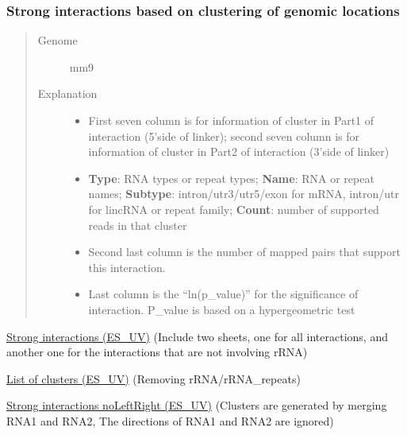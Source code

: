 \documentclass[letterpaper,10pt,english]{sphinxmanual}
\begin{document}
\subsubsection{Strong interactions based on clustering of genomic locations}
\label{Data_Resources:strong-interactions-based-on-clustering-of-genomic-locations}\begin{quote}\begin{description}
\item[{Genome}] \leavevmode
mm9

\item[{Explanation}] \leavevmode\begin{itemize}
\item {} 
First seven column is for information of cluster in Part1 of interaction (5'side of linker); second seven column is for information of cluster in Part2 of interaction (3'side of linker)

\item {} 
\textbf{Type}: RNA types or repeat types; \textbf{Name}: RNA or repeat names; \textbf{Subtype}: intron/utr3/utr5/exon for mRNA, intron/utr for lincRNA or repeat family; \textbf{Count}: number of supported reads in that cluster

\item {} 
Second last column is the number of mapped pairs that support this interaction.

\item {} 
Last column is the ``ln(p\_value)'' for the significance of interaction. P\_value is based on a hypergeometric test

\end{itemize}

\end{description}\end{quote}

\href{http://systemsbio.ucsd.edu/RNA-Hi-C/Data/ACCT\_GGCG\_interaction\_clusters.xlsx}{Strong interactions (ES\_UV)} (Include two sheets, one for all interactions, and another one for the interactions that are not involving rRNA)

\href{http://systemsbio.ucsd.edu/RNA-Hi-C/Data/ACCT\_GGCG\_cluster\_total\_sort.xlsx}{List of clusters (ES\_UV)} (Removing rRNA/rRNA\_repeats)

\href{http://systemsbio.ucsd.edu/RNA-Hi-C/Data/ACCT\_GGCG\_interaction\_clusters\_noLeftRight.xlsx}{Strong interactions noLeftRight (ES\_UV)} (Clusters are generated by merging RNA1 and RNA2, The directions of RNA1 and RNA2 are ignored)
\end{document}
